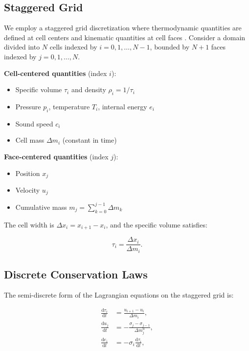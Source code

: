 \documentclass[12pt,a4paper]{article}
\newcommand{\dd}{\mathrm{d}}
\begin{document}
\subsection{Staggered Grid}

We employ a staggered grid discretization where thermodynamic quantities are defined at cell centers and kinematic quantities at cell faces \citep{Caramana1998, Despres2017}. Consider a domain divided into $N$ cells indexed by $i = 0, 1, \ldots, N-1$, bounded by $N+1$ faces indexed by $j = 0, 1, \ldots, N$.

\textbf{Cell-centered quantities} (index $i$):
\begin{itemize}
    \item Specific volume $\tau_i$ and density $\rho_i = 1/\tau_i$
    \item Pressure $p_i$, temperature $T_i$, internal energy $e_i$
    \item Sound speed $c_i$
    \item Cell mass $\Delta m_i$ (constant in time)
\end{itemize}

\textbf{Face-centered quantities} (index $j$):
\begin{itemize}
    \item Position $x_j$
    \item Velocity $u_j$
    \item Cumulative mass $m_j = \sum_{k=0}^{j-1} \Delta m_k$
\end{itemize}

The cell width is $\Delta x_i = x_{i+1} - x_i$, and the specific volume satisfies:

\begin{equation}
    \tau_i = \frac{\Delta x_i}{\Delta m_i}.
    \label{eq:tau_discrete}
\end{equation}

\subsection{Discrete Conservation Laws}

The semi-discrete form of the Lagrangian equations on the staggered grid is:

\begin{align}
    \frac{\dd \tau_i}{\dd t} &= \frac{u_{i+1} - u_i}{\Delta m_i}, \label{eq:discrete_mass} \\
    \frac{\dd u_j}{\dd t} &= -\frac{\sigma_j - \sigma_{j-1}}{\Delta m_j^u}, \label{eq:discrete_momentum} \\
    \frac{\dd e_i}{\dd t} &= -\sigma_i \frac{\dd \tau_i}{\dd t}, \label{eq:discrete_energy}
\end{align}
\end{document}
